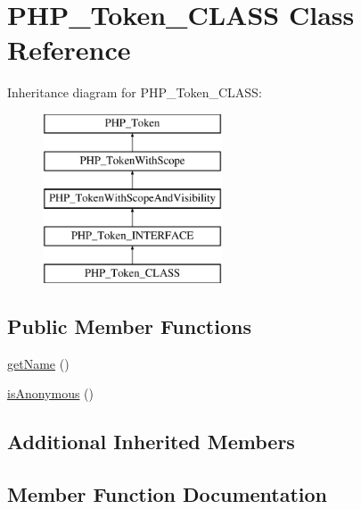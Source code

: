 \hypertarget{class_p_h_p___token___c_l_a_s_s}{}\section{P\+H\+P\+\_\+\+Token\+\_\+\+C\+L\+A\+SS Class Reference}
\label{class_p_h_p___token___c_l_a_s_s}
Inheritance diagram for P\+H\+P\+\_\+\+Token\+\_\+\+C\+L\+A\+SS\+:\begin{figure}[H]
\begin{center}
\leavevmode
\includegraphics[height=5.000000cm]{class_p_h_p___token___c_l_a_s_s}
\end{center}
\end{figure}
\subsection*{Public Member Functions}
\begin{DoxyCompactItemize}
\item 
\mbox{\hyperlink{class_p_h_p___token___c_l_a_s_s_a3d0963e68bb313b163a73f2803c64600}{get\+Name}} ()
\item 
\mbox{\hyperlink{class_p_h_p___token___c_l_a_s_s_a1e7b2580aa378d9676b1212e012a177f}{is\+Anonymous}} ()
\end{DoxyCompactItemize}
\subsection*{Additional Inherited Members}


\subsection{Member Function Documentation}
\mbox{\label{class_p_h_p___token___c_l_a_s_s_a3d0963e68bb313b163a73f2803c64600}} 
